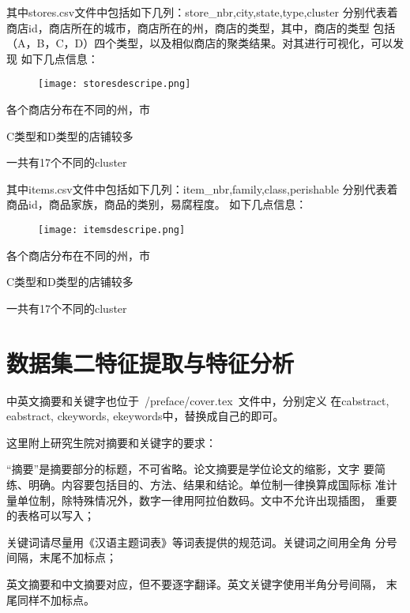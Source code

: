 其中stores.csv文件中包括如下几列：store\_nbr,city,state,type,cluster
分别代表着商店id，商店所在的城市，商店所在的州，商店的类型，其中，商店的类型
包括（A，B，C，D）四个类型，以及相似商店的聚类结果。对其进行可视化，可以发现
如下几点信息：
\begin{figure}[htbp]
  \centering
  \texttt{[image: storesdescripe.png]}
\end{figure}

\begin{asparaenum}
\item 各个商店分布在不同的州，市
\item C类型和D类型的店铺较多
\item 一共有17个不同的cluster
\end{asparaenum}


其中items.csv文件中包括如下几列：item\_nbr,family,class,perishable
分别代表着商品id，商品家族，商品的类别，易腐程度。
如下几点信息：
\begin{figure}[htbp]
  \centering
  \texttt{[image: itemsdescripe.png]}
\end{figure}

\begin{asparaenum}
\item 各个商店分布在不同的州，市
\item C类型和D类型的店铺较多
\item 一共有17个不同的cluster
\end{asparaenum}






\section{数据集二特征提取与特征分析}
中英文摘要和关键字也位于~{/preface/cover.tex}~文件中，分别定义
在cabstract, eabstract, ckeywords, ekeywords中，替换成自己的即可。

这里附上研究生院对摘要和关键字的要求：
\begin{asparaenum}
\item “摘要”是摘要部分的标题，不可省略。论文摘要是学位论文的缩影，文字
  要简练、明确。内容要包括目的、方法、结果和结论。单位制一律换算成国际标
  准计量单位制，除特殊情况外，数字一律用阿拉伯数码。文中不允许出现插图，
  重要的表格可以写入；
\item 关键词请尽量用《汉语主题词表》等词表提供的规范词。关键词之间用全角
  分号间隔，末尾不加标点；
\item 英文摘要和中文摘要对应，但不要逐字翻译。英文关键字使用半角分号间隔，
  末尾同样不加标点。
\end{asparaenum}

